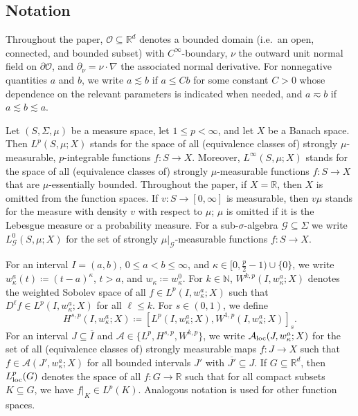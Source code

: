 \documentclass[reqno]{amsart}
\newcommand{\N}{\mathbb{N}}
\newcommand{\R}{\mathbb{R}}
\newcommand{\sG}{\mathscr{G}}
\newcommand{\sO}{\mathscr{O}}
\newcommand{\ce}{\coloneqq}
\newcommand{\seq}{\subseteq}
\newcommand{\1}{\mathbf{1}}
\newcommand{\grad}{\nabla}
\newcommand{\loc}{\textup{loc}}
\begin{document}
\subsection{Notation}\label{subsec:notation}

Throughout the paper, $\sO\seq\R^d$ denotes a bounded domain (i.e.\ an open, connected, and bounded subset) with $C^{\infty}$-boundary, $\nu$ the outward unit normal field on $\partial\sO$, and $\partial_\nu=\nu\cdot\grad$ the associated normal derivative.
For nonnegative quantities $a$ and $b$, we write $a\lesssim b$ if $a\le Cb$ for some constant $C>0$ whose dependence on the relevant parameters is indicated when needed, and $a\eqsim b$ if $a\lesssim b\lesssim a$.

Let $(S,\Sigma,\mu)$ be a measure space, let $1\leq p<\infty$, and let $X$ be a Banach space. Then $L^p(S,\mu;X)$ stands for the space of all (equivalence classes of) strongly $\mu$-measurable, $p$-inte\-grable functions $f\colon S\to X$. 
	Moreover, $L^\infty(S,\mu;X)$ stands for the space of all (equivalence classes of) strongly $\mu$-measu\-rable functions $f\colon S\to X$ that are $\mu$-essentially bounded.
	Throughout the paper, if $X=\R$, then $X$ is omitted from the function spaces.
	If $v\colon S\to[0,\infty]$ is measurable, then $v\mu$ stands for the measure with density $v$ 
	with respect to $\mu$; $\mu$ is omitted if it is the Lebesgue measure or a probability measure. 
For a sub-$\sigma$-algebra $\sG\subseteq\Sigma$ we write $L^0_\sG(S,\mu;X)$ for the set of strongly $\mu|_\sG$-measurable functions $f\colon S\to X$. 

    
For an interval $I=(a,b)$, $0\le a<b\le \infty$, and $\kappa\in [0,\frac{p}{2}-1)\cup\{0\}$, we write $w_\kappa^a(t)\ce (t-a)^\kappa$, $t>a$, and $w_\kappa \ce w_\kappa^0$.
For $k\in\N$, $W^{k,p}(I,w_\kappa^a;X)$ denotes the weighted Sobolev space of all $f \in L^p(I,w_\kappa^a;X)$ such that $D^\ell f \in L^p(I,w_\kappa^a;X)$ for all $\ell\le k$. For $s\in(0,1)$, we define 
\begin{equation*}
    H^{s,p}(I,w_\kappa^a;X)\ce [L^p(I,w_\kappa^a;X), W^{1,p}(I,w_\kappa^a;X)]_s.
\end{equation*}
For an interval $J\subseteq \overline{I}$ and  $\mathcal{A}\in \{L^p, H^{s,p}, W^{k,p}\}$, we write $\mathcal{A}_{\textup{loc}}(J,w_\kappa^a;X)$ for the set of all (equivalence classes of) strongly measurable maps $f\colon J\to X$ such that $f\in \mathcal{A}(J',w_\kappa^a;X)$ for all bounded intervals $J'$ with $\overline{J'}\subseteq J$. 
If $G\subseteq \R^d$, then $L^p_\loc(G)$ denotes the space of all $f\colon G\to \R$ such that for all compact subsets $K\subseteq G$, we have $f|_K\in L^p(K)$. Analogous notation is used for other function spaces.  
\end{document}

